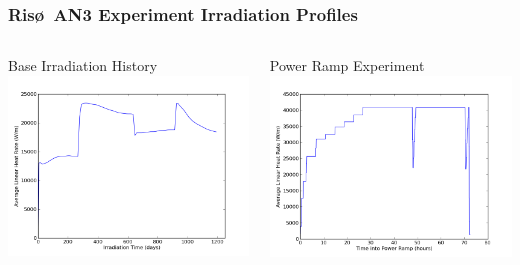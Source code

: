 \documentclass{beamer}
\begin{document}
\begin{frame}
\frametitle{Ris\o~AN3 Experiment Irradiation Profiles}

\begin{columns}
 \begin{column}{0.5\textwidth}
  \centering
  Base Irradiation History
  \includegraphics[width=1.\textwidth]{./base_irrad.png}
 \end{column}
 \begin{column}{0.5\textwidth}
  \centering
  Power Ramp Experiment
  \includegraphics[width=1.\textwidth]{./power_ramp.png}
 \end{column}
\end{columns}

\end{frame}
\end{document}
